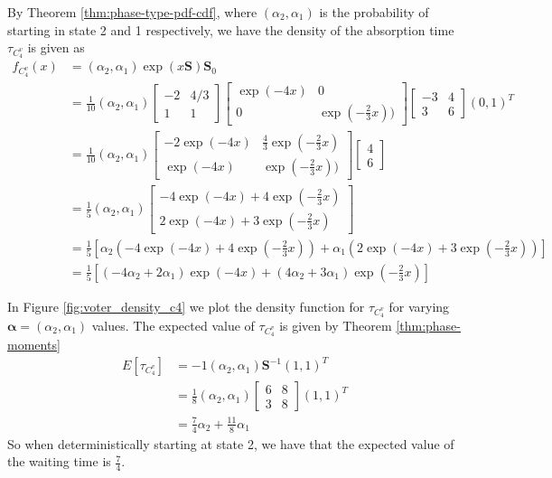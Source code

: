 By Theorem \ref{thm:phase-type-pdf-cdf}, where $(\alpha_2, \alpha_1)$ is the probability of starting in state 2 and 1 respectively, we have the density of the absorption time $\tau_{C^{v}_4}$ is given as
\begin{align*}
    f_{C^{v}_4}(x) &= (\alpha_2, \alpha_1) \exp(x\mathbf{S}) \mathbf{S}_0\\
    &= \frac{1}{10} (\alpha_2, \alpha_1) \begin{bmatrix}
    -2 & 4/3\\
    1 & 1
\end{bmatrix}
\begin{bmatrix}
\exp(-4x) & 0\\
0 & \exp(- \frac{2}{3} x))
\end{bmatrix}
\begin{bmatrix}
    -3 & 4\\
    3 & 6
\end{bmatrix}
(0,1)^T\\
&= \frac{1}{10} (\alpha_2, \alpha_1)
\begin{bmatrix}
-2 \exp(-4x) & \frac{4}{3} \exp(-\frac{2}{3} x)\\
\exp(-4x) & \exp(- \frac{2}{3} x))
\end{bmatrix}
\begin{bmatrix}
    4\\
    6
\end{bmatrix}\\
&= \frac{1}{5} (\alpha_2, \alpha_1)
\begin{bmatrix}
-4 \exp(-4x) + 4 \exp(-\frac{2}{3} x)\\
2 \exp(-4x) + 3 \exp(-\frac{2}{3} x)
\end{bmatrix}\\
&= \frac{1}{5} \left[ \alpha_2 \left( -4 \exp(-4x) + 4 \exp\left(-\frac{2}{3} x\right) \right) + \alpha_1 \left( 2 \exp(-4x) + 3 \exp\left(-\frac{2}{3} x\right) \right) \right]\\
&= \frac{1}{5} \left[ (-4 \alpha_2 + 2 \alpha_1) \exp(-4x) + (4 \alpha_2 + 3 \alpha_1) \exp\left(-\frac{2}{3} x\right)\right]
\end{align*}

In Figure \ref{fig:voter_density_c4} we plot the density function for $\tau_{C^{v}_4}$ for varying $\boldsymbol{\alpha} = (\alpha_2, \alpha_1)$ values.
The expected value of $\tau_{C^{v}_4}$ is given by Theorem \ref{thm:phase-moments}
\begin{align*}
    E[\tau_{C^{v}_4}] &= -1 (\alpha_2, \alpha_1) \mathbf{S}^{-1} (1, 1)^T\\
    &= \frac{1}{8} (\alpha_2, \alpha_1) \begin{bmatrix}
    6 & 8\\
    3 & 8
    \end{bmatrix} (1,1)^T\\
    &= \frac{7}{4} \alpha_2 + \frac{11}{8} \alpha_1
\end{align*}
So when deterministically starting at state 2, we have that the expected value of the waiting time is $\frac{7}{4}$.

